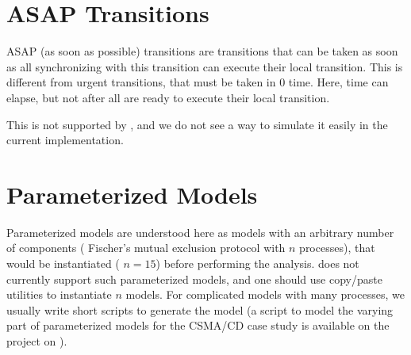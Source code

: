 % 




\section{ASAP Transitions}

ASAP (as soon as possible) transitions are transitions that can be taken as soon as all \IPTA{} synchronizing with this transition can execute their local transition.
This is different from urgent transitions, that must be taken in 0 time.
Here, time can elapse, but not after all \IPTA{} are ready to execute their local transition.

This is not supported by \imitator{}, and we do not see a way to simulate it easily in the current implementation.



\section{Parameterized Models}

Parameterized models are understood here as models with an arbitrary number of components (\eg{} Fischer's mutual exclusion protocol with $n$ processes), that would be instantiated (\eg{} $n = 15$) before performing the analysis.
\imitator{} does not currently support such parameterized models, and one should use copy/paste utilities to instantiate $n$ models.
For complicated models with many processes, we usually write short scripts to generate the model (a script  to model the varying part of parameterized models for the CSMA/CD case study is available on the \imitator{} project on \GitHubIMI{}).




